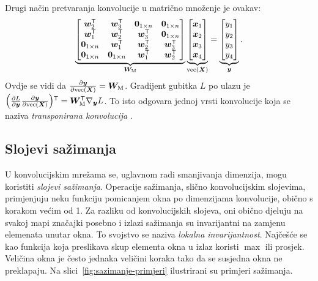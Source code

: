 \documentclass[utf8, diplomski, lmodern]{fer}
\begin{document}
Drugi način pretvaranja konvolucije u matrično množenje je ovakav: 
\begin{align}
\underbrace{
\begin{bmatrix}
\vec w_2^\tp & \vec w_3^\tp & \cvec 0_{1\times n} & \cvec 0_{1\times n} \\
\vec w_1^\tp & \vec w_2^\tp & \vec w_3^\tp & \cvec 0_{1\times n} \\
\cvec 0_{1\times n} & \vec w_1^\tp & \vec w_2^\tp & \vec w_3^\tp \\
\cvec 0_{1\times n} & \cvec 0_{1\times n} & \vec w_1^\tp & \vec w_2^\tp 
\end{bmatrix}
}_{\vec W_\text{M}}
\underbrace{
	\begin{bmatrix}
	\vec x_1 \\ \vec x_2 \\ \vec x_3 \\ \vec x_4 
	\end{bmatrix}
}_{\vecfunc(\vec X)}
= 
\underbrace{
	\begin{bmatrix}
	y_1 \\ y_2 \\ y_3 \\y_4     
	\end{bmatrix}
}_{\vec y}
\text{.}
\end{align}
Ovdje se vidi da $\pd{\vec y}{\vecfunc(\vec X)}=\vec W_\text{M}$. Gradijent gubitka $L$ po ulazu je $\del{\pd{L}{\vec y}\pd{\vec y}{\vecfunc(\vec X)}}^\tp = \vec W_\text{M}^\tp\nabla_{\vec y}L$. To isto odgovara jednoj vrsti konvolucije koja se naziva \emph{transponirana konvolucija} \citep{Segvic:2018:DUUUKS}.

\subsection{Slojevi sažimanja}

U konvolucijskim mrežama se, uglavnom radi smanjivanja dimenzija, mogu koristiti \emph{slojevi sažimanja}. Operacije sažimanja, slično konvolucijskim slojevima, primjenjuju neku funkciju pomicanjem okna po dimenzijama konvolucije, obično s korakom većim od 1. Za razliku od konvolucijskih slojeva, oni obično djeluju na svakoj mapi značajki posebno i izlazi sažimanja su invarijantni na zamjenu elemenata unutar okna. To svojstvo se naziva \emph{lokalna invarijantnost}. Najčešće se kao funkcija koja preslikava skup elementa okna u izlaz koristi $\max$ ili prosjek. Veličina okna je često jednaka veličini koraka tako da se susjedna okna ne preklapaju. Na slici~\ref{fig:sazimanje-primjeri} ilustrirani su primjeri sažimanja.
\end{document}
